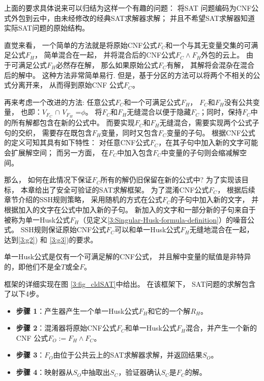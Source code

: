 上面的要求具体说来可以归结为这样一个有趣的问题：
将SAT 问题编码为CNF公式外包到云中，由未经修改的经典SAT求解器求解；
并且不希望SAT求解器知道实际SAT问题的原始结构。

直觉来看，
一个简单的方法就是将原始CNF公式$F_C$和一个与其无变量交集的可满足公式$F_H$，
简单混合在一起，
并将混合后的CNF公式$F_C\wedge F_H$外包的云上。
由于可满足公式$F_H$必然存在解，
那么如果原始公式$F_C$有解，
其解将会混杂在混合后的解中。
这种方法非常简单易行.
但是，基于分区的方法可以将两个不相关的公式分离开来，
从而得到原始CNF 公式$F_C$。

再来考虑一个改进的方法:
任意公式$F_C$和一个可满足公式$F_H$，
$F_C$和$F_H$没有公共变量， 也即：$V_{F_C}$ $\cap$ $V_{F_H}$ =$\phi$。
将$F_C$和$F_H$无缝混合以便于隐藏$F_C$；同时，保持$F_C$中的所有解都包含在新的公式中。
而要实现$F_C$和$F_H$无缝混合，需要实现两个公式子句的交织，
需要存在既包含$F_H$变量，同时又包含$F_C$变量的子句。
根据CNF公式的定义可知其具有如下特性：
对任意CNF公式$F_C$，在其子句中加入新的文字可能会扩展解空间；
而另一方面，
在$F_C$中加入包含$F_C$中变量的子句则会缩减解空间。

那么，
如何在此情况下保证$F_C$所有的解仍旧保留在新的公式中?
为了实现该目标，
本章给出了安全可验证的SAT求解框架。
为了混淆CNF公式$F_C$，
根据后续章节介绍的SSH规则策略，
采用随机的方式在公式$F_C$的子句中加入新的文字，
并根据加入的文字在公式中加入新的子句。
新加入的文字和一部分新的子句来自于被称为单一Husk公式$F_H$（见定义\ref{3:Singular-Husk-formula-definition}）的噪音公式。
SSH规则保证原始CNF公式$F_C$可以和单一Husk公式$F_H$无缝地混合在一起，
达到\ref{3:g2}) 和 \ref{3:g3})的要求。

\begin{definition}[单一Husk 公式]\label{3:Singular-Husk-formula-definition}
单一Husk公式是仅有一个可满足解的CNF公式，
并且解中变量的赋值是非特异的，即他们不是全$T$或全$F$。
\end{definition}

框架的详细实现在图 \ref{3:fig_cldSAT}中给出。
在该框架下， SAT问题的求解包含了以下4步。
\begin{itemize}
\item \textbf{步骤 1}：产生器产生一个单一Husk公式$F_H$和它的一个解$R_H$。
\item \textbf{步骤 2}：混淆器将原始CNF公式$F_C$和单一Husk公式$F_H$混合，并产生一个新的CNF 公式$F_O:=F_H\wedge F_C$。
\item \textbf{步骤 3}：$F_O$由位于公共云上的SAT求解器求解，并返回结果$S_O$。
\item \textbf{步骤 4}：映射器从$S_O$中抽取出$S_C$，验证器确认$S_C$是$F_C$的解。
\end{itemize}


